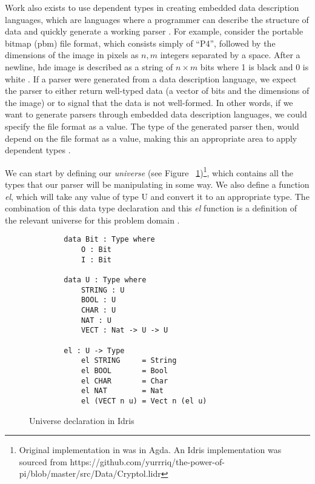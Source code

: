 Work also exists to use dependent types in creating embedded data description
languages, which are languages where a programmer can describe the structure of
data and quickly generate a working parser \cite{power_of_pi}.  For example,
consider the portable bitmap (pbm) file format, which consists simply of ``P4'',
followed by the dimensions of the image in pixels as $n, m$ integers separated
by a space. After a newline, hde image is described as a string of $n\times m $
bits where 1 is black and 0 is white \cite{pmb_spec}. If a parser were generated
from a data description language, we expect the parser to either return
well-typed data (a vector of bits and the dimensions of the image) or to signal
that the data is not well-formed. In other words, if we want to generate parsers
through embedded data description languages, we could specify the file format as
a value. The type of the generated parser then, would depend on the file format
as a value, making this an appropriate area to apply dependent types
\cite{power_of_pi}. 

We can start by defining our \textit{universe} (see Figure
~\ref{universe})\footnote{Original implementation in \cite{power_of_pi} was in
Agda. An Idris implementation was sourced from
https://github.com/yurrriq/the-power-of-pi/blob/master/src/Data/Cryptol.lidr},
which contains all the types that our parser will be manipulating in some way.
We also define a function \textit{el}, which will take any value of type U and
convert it to an appropriate type. The combination of this data type declaration
and this \textit{el} function is a definition of the relevant universe for this
problem domain \cite{power_of_pi}. 

\begin{figure}[h]
    \caption{Universe declaration in Idris \cite{power_of_pi}}
    \label{universe}
    \begin{lstlisting}
        data Bit : Type where 
            O : Bit 
            I : Bit

        data U : Type where
            STRING : U
            BOOL : U
            CHAR : U
            NAT : U
            VECT : Nat -> U -> U
        
        el : U -> Type
            el STRING     = String
            el BOOL       = Bool
            el CHAR       = Char
            el NAT        = Nat
            el (VECT n u) = Vect n (el u)
    \end{lstlisting}
\end{figure}

